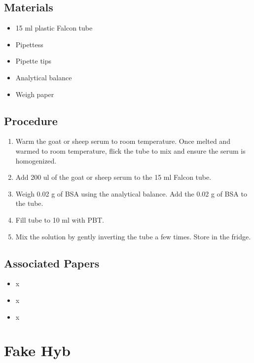 \documentclass[
  letterpaper,
  DIV=11,
  numbers=noendperiod]{scrreprt}
\providecommand{\tightlist}{%
  \setlength{\itemsep}{0pt}\setlength{\parskip}{0pt}}\usepackage{longtable,booktabs,array}
\begin{document}
\hypertarget{materials-100}{%
\section{Materials}\label{materials-100}}

\begin{itemize}
\tightlist
\item
  15 ml plastic Falcon tube
\item
  Pipettess
\item
  Pipette tips
\item
  Analytical balance
\item
  Weigh paper
\end{itemize}

\hypertarget{procedure-100}{%
\section{Procedure}\label{procedure-100}}

\begin{enumerate}
\def\labelenumi{\arabic{enumi}.}
\item
  Warm the goat or sheep serum to room temperature. Once melted and
  warmed to room temperature, flick the tube to mix and ensure the serum
  is homogenized.
\item
  Add 200 ul of the goat or sheep serum to the 15 ml Falcon tube.
\item
  Weigh 0.02 g of BSA using the analytical balance. Add the 0.02 g of
  BSA to the tube.
\item
  Fill tube to 10 ml with PBT.
\item
  Mix the solution by gently inverting the tube a few times. Store in
  the fridge.
\end{enumerate}

\hypertarget{associated-papers-74}{%
\section{Associated Papers}\label{associated-papers-74}}

\begin{itemize}
\tightlist
\item
  x
\item
  x
\item
  x
\end{itemize}

\hypertarget{sec-recipe-fake_hyb}{%
\chapter{Fake Hyb}\label{sec-recipe-fake_hyb}}
\end{document}
